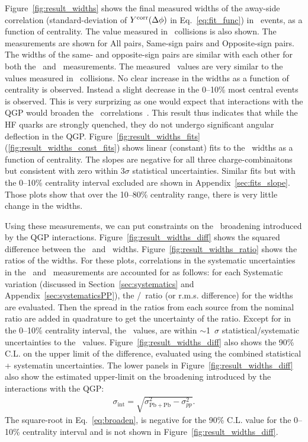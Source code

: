 Figure~\ref{fig:result_widths} shows the final measured widths of 
  the away-side correlation (standard-deviation of $Y^{\mathrm{corr}}(\mbox{$\Delta\phi$})$ in Eq.~\eqref{eq:fit_func})
  in \PbPb\ events, as a function of centrality.
The value measured in \pp\ collisions is also shown.
The measurements are shown for All pairs, Same-sign pairs 
  and Opposite-sign pairs.
The widths of the same- and opposite-sign pairs are similar 
  with each other for both the \PbPb\ and \pp\ measurements.
The measured \PbPb\ values are very similar to the values measured in 
  \pp\ collisions.
No clear increase in the widths as a function of centrality 
  is observed.
Instead a slight decrease in the 0--10\% most central events is observed.
This is very surprizing as one would expect that interactions
  with the QGP would broaden the \Dphi\ correlations~\cite{Nahrgang:2013saa}.
This result thus indicates that while the HF quarks are strongly quenched,
  they do not undergo significant angular deflection in the QGP. 
Figure~\ref{fig:result_widths_fits} (\ref{fig:result_widths_const_fits})
  shows linear (constant) fits to the
  \PbPb\ widths as a function of centrality.
The slopes are negative for all three charge-combinaitons
  but consistent with zero within 3$\sigma$ statistical uncertainties.
Similar fits but with the 0--10\% centrality interval excluded 
  are shown in Appendix~\ref{sec:fits_slope}.
Those plots show that over the 10--80\% centrality range,
  there is very little change in the widths.

Using these measurements, we can put constraints on the \Dphi\ 
  broadening introduced by the QGP interactions.
Figure~\ref{fig:result_widths_diff} shows the squared difference
  between the \pp\ and \PbPb\ widths.
Figure~\ref{fig:result_widths_ratio} shows the ratios of the widths.
For these plots, correlations in the systematic uncertainties
  in the \PbPb\ and \pp\ measurements are accounted for as follows:
  for each Systematic variation (discussed in 
  Section~\ref{sec:systematics} and Appendix~\ref{sec:systematicsPP}),
  the \PbPb/\pp\ ratio (or r.m.s. difference) for the widths are evaluated. 
Then the spread in the ratios from each source from the nominal ratio
  are added in quadrature to get the uncertainty of the ratio.
Except for in the 0--10\% centrality interval,
  the \PbPb\ values, are within $\sim$1~$\sigma$
  statistical/systematic uncertainties to the \pp\ values.
Figure~\ref{fig:result_widths_diff} also shows the 90\% C.L.
  on the upper limit of the difference, evaluated using the
  combined statistical + systematin uncertainties.
The lower panels in Figure~\ref{fig:result_widths_diff}
  also show the estimated upper-limit on the 
  broadening introduced by the interactions with the QGP:
\begin{eqnarray}
\sigma_{\mathrm{int}}=\sqrt{\sigma^{2}_{\mathrm{Pb+Pb}} - \sigma^{2}_{pp}}.
\label{eq:broaden}
\end{eqnarray}
The square-root in Eq.~\eqref{eq:broaden}, is negative for the 90\% C.L. value 
  for the 0--10\% centrality interval and is not shown 
  in Figure~\ref{fig:result_widths_diff}.
  

